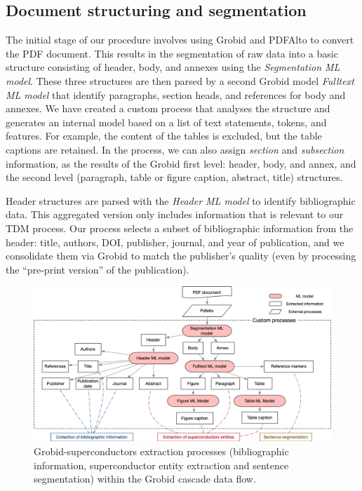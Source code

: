 \subsection{Document structuring and segmentation}

The initial stage of our procedure involves using Grobid and PDFAlto to convert the PDF document. This results in the segmentation of raw data into a basic structure consisting of header, body, and annexes using the \emph{Segmentation ML model}.
These three structures are then parsed by a second Grobid model \emph{Fulltext ML model} that identify paragraphs, section heads, and references for body and annexes. 
We have created a custom process that analyses the structure and generates an internal model based on a list of text statements, tokens, and features. For example, the content of the tables is excluded, but the table captions are retained.
In the process, we can also assign \textit{section} and \textit{subsection} information, as the results of the Grobid first level: header, body, and annex, and the second level (paragraph, table or figure caption, abstract, title) structures.

Header structures are parsed with the \emph{Header ML model} to identify bibliographic data. 
This aggregated version only includes information that is relevant to our TDM process. 
Our process selects a subset of bibliographic information from the header: title, authors, DOI, publisher, journal, and year of publication, and we consolidate them via Grobid to match the publisher's quality (even by processing the ``pre-print version'' of the publication).

\begin{figure}[htbp]
    \includegraphics[width=\textwidth]{figures/automatic_extraction_supercon/document-structuring-colors}
    \caption{Grobid-superconductors extraction processes (bibliographic information, superconductor entity extraction and sentence segmentation) within the Grobid cascade data flow.}
    \label{fig:grobid-document-processing}
\end{figure}

